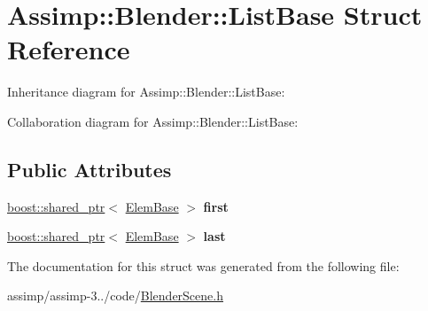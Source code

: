 \hypertarget{struct_assimp_1_1_blender_1_1_list_base}{\section{Assimp\+:\+:Blender\+:\+:List\+Base Struct Reference}
\label{struct_assimp_1_1_blender_1_1_list_base}
}


Inheritance diagram for Assimp\+:\+:Blender\+:\+:List\+Base\+:


Collaboration diagram for Assimp\+:\+:Blender\+:\+:List\+Base\+:
\subsection*{Public Attributes}
\begin{DoxyCompactItemize}
\item 
\hypertarget{struct_assimp_1_1_blender_1_1_list_base_a170803e5ce03885c880ffcbf55c50619}{\hyperlink{classboost_1_1shared__ptr}{boost\+::shared\+\_\+ptr}$<$ \hyperlink{struct_assimp_1_1_blender_1_1_elem_base}{Elem\+Base} $>$ {\bfseries first}}\label{struct_assimp_1_1_blender_1_1_list_base_a170803e5ce03885c880ffcbf55c50619}

\item 
\hypertarget{struct_assimp_1_1_blender_1_1_list_base_a3d3edadbc5dcbd1fb087594d59224b4e}{\hyperlink{classboost_1_1shared__ptr}{boost\+::shared\+\_\+ptr}$<$ \hyperlink{struct_assimp_1_1_blender_1_1_elem_base}{Elem\+Base} $>$ {\bfseries last}}\label{struct_assimp_1_1_blender_1_1_list_base_a3d3edadbc5dcbd1fb087594d59224b4e}

\end{DoxyCompactItemize}


The documentation for this struct was generated from the following file\+:\begin{DoxyCompactItemize}
\item 
assimp/assimp-\/3../code/\hyperlink{_blender_scene_8h}{Blender\+Scene.\+h}\end{DoxyCompactItemize}

